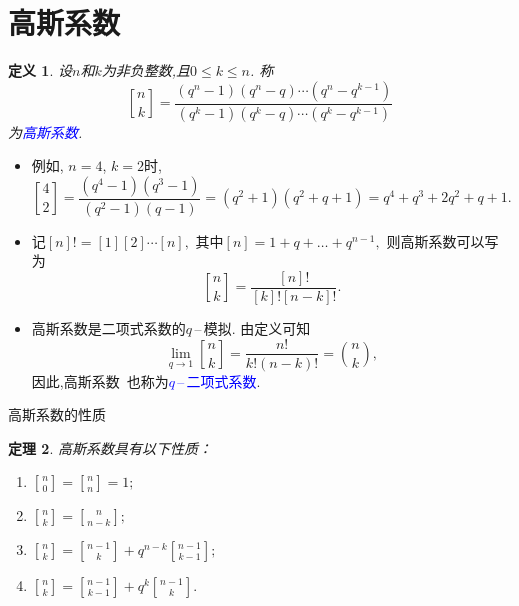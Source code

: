 \documentclass[punct]{ctexbeamer}
\newtheorem{thm}{定理}[section]
\newtheorem{defi}[thm]{定义}
\newcommand{\blue}{\textcolor{blue}}
\begin{document}
\section{高斯系数}
\begin{frame}
	\begin{defi}
设$n$和$k$为非负整数,且$0\leq k\leq n$. 称
\begin{equation*}
{n\brack
k}=\frac{(q^n-1)(q^n-q)\cdots(q^n-q^{k-1})}{(q^k-1)(q^k-q)\cdots(q^k-q^{k-1})}
\end{equation*}
为\blue{高斯系数}.
\end{defi}

\begin{itemize}
    \item
    例如, $n=4$, $k=2$时,
    $${4\brack 2} = \frac{(q^4-1)(q^3-1)}{(q^2-1)(q-1)} =(q^2+1)(q^2+q+1)=q^4+q^3+2q^2+q+1.$$
    \item
    记$[n]!=[1] [2] \cdots[n],$
    其中$[n]=1+q+\ldots+q^{n-1},$
    则高斯系数可以写为
    $${n\brack k}=\frac{[n]!}{[k]![n-k]!}.$$

    \item
    高斯系数是二项式系数的$q$\,--\,模拟. 由定义可知
    $$\displaystyle\lim_{q\rightarrow 1}{n\brack k}=\frac{n!}{k!(n-k)!}={n\choose
        k},$$
    因此,高斯系数\, 也称为\blue{$q$\,--\,二项式系数}.
\end{itemize}
\end{frame}

\begin{frame}{高斯系数的性质}
	\begin{thm}\label{qrec}
		高斯系数具有以下性质：
		\begin{enumerate}
		\item
		$\displaystyle{n\brack 0}={n\brack n}=1; $
		\item
		$\displaystyle{n\brack k}={n\brack {n-k}};$
		\item
		$\displaystyle{n\brack k}={n-1\brack k}+q^{n-k}{n-1\brack{k-1}};$
		\item
		$\displaystyle{n\brack k}={n-1\brack{k-1}}+q^k{n-1\brack k}.$
		\end{enumerate}
	\end{thm}

\end{frame}

%
\end{document}
